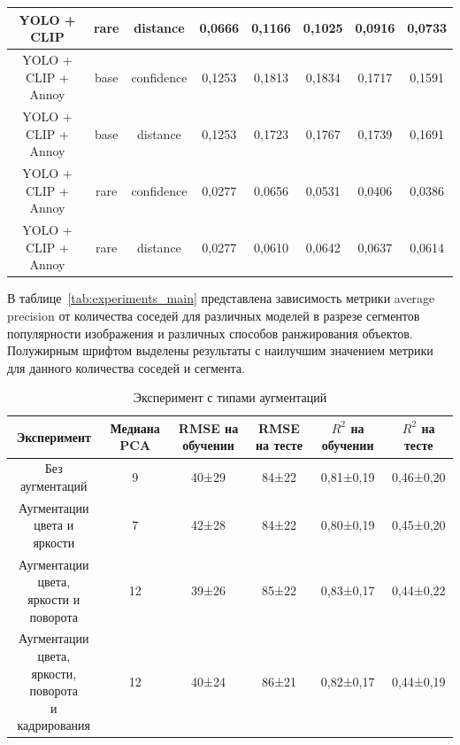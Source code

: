 \documentclass[a4paper,14pt]{article}
\begin{document}
\begin{landscape}
\begin{table}[H]
\begin{tabular}{ccc|ccccc|}
                YOLO + CLIP         & rare    & distance   & \textbf{0,0666} & \textbf{0,1166} & 0,1025          & 0,0916          & 0,0733          \\ \hline
                YOLO + CLIP + Annoy & base    & confidence & 0,1253          & 0,1813          & 0,1834          & 0,1717          & 0,1591          \\
                YOLO + CLIP + Annoy & base    & distance   & 0,1253          & 0,1723          & 0,1767          & 0,1739          & 0,1691          \\
                YOLO + CLIP + Annoy & rare    & confidence & 0,0277          & 0,0656          & 0,0531          & 0,0406          & 0,0386          \\
                YOLO + CLIP + Annoy & rare    & distance   & 0,0277          & 0,0610          & 0,0642          & 0,0637          & 0,0614          \\
                \bottomrule
            \end{tabular}
        \end{table}

        В таблице~\ref{tab:experiments_main} представлена зависимость метрики average precision от количества соседей
        для различных моделей в разрезе сегментов популярности изображения и различных способов ранжирования объектов.
        Полужирным шрифтом выделены результаты с наилучшим значением метрики для данного количества соседей и сегмента.
    
        \begin{table}[H]
    	\centering
    	\caption{Эксперимент с типами аугментаций}
    	\label{tab:exp_base}
    	
    	\begin{tabular}{cccccc}
    		\toprule
    		Эксперимент                                    & Медиана PCA  & RMSE на обучении  & RMSE на тесте & $R^2$ на обучении & $R^2$ на тесте  \\
    		\midrule
    		Без аугментаций & 9 & 40±29       & 84±22      & 0,81±0,19 & 0,46±0,20 \\ \hline
    		\makecell{Аугментации \\ цвета и яркости}   & 7 & 42±28       & 84±22      & 0,80±0,19 & 0,45±0,20 \\ \hline
    		\makecell{Аугментации цвета,\\ яркости и поворота}    & 12  & 39±26       & 85±22      & 0,83±0,17 & 0,44±0,22 \\ \hline
    		\makecell{Аугментации цвета,\\ яркости, поворота \\ и кадрирования}    & 12  & 40±24       & 86±21      & 0,82±0,17 & 0,44±0,19 \\
    		\bottomrule
    	\end{tabular}
    	

\end{table}
\end{landscape}
\end{document}

